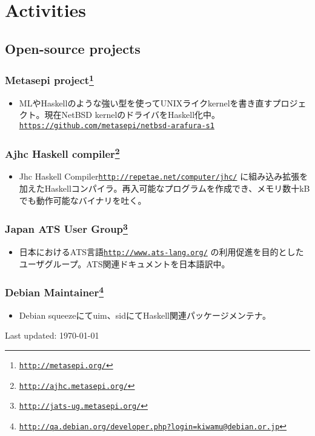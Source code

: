 \documentclass[letterpaper]{article}
\def\footer{
  \begin{center}
    \begin{footnotesize}
      Last updated: \today
    \end{footnotesize}
  \end{center}
}
\begin{document}
\section*{Activities}

\subsection*{Open-source projects}

\subsubsection*{Metasepi project\footnote{\href{http://metasepi.org/}{\tt http://metasepi.org/}}}
\begin{itemize}
\item MLやHaskellのような強い型を使ってUNIXライクkernelを書き直すプロジェクト。現在NetBSD kernelのドライバをHaskell化中。 \href{https://github.com/metasepi/netbsd-arafura-s1}{\tt https://github.com/metasepi/netbsd-arafura-s1}
\end{itemize}

\subsubsection*{Ajhc Haskell compiler\footnote{\href{http://ajhc.metasepi.org/}{\tt http://ajhc.metasepi.org/}}}
\begin{itemize}
\item Jhc Haskell Compiler\href{http://repetae.net/computer/jhc/}{\tt http://repetae.net/computer/jhc/} に組み込み拡張を加えたHaskellコンパイラ。再入可能なプログラムを作成でき、メモリ数十kBでも動作可能なバイナリを吐く。
\end{itemize}

\subsubsection*{Japan ATS User Group\footnote{\href{http://jats-ug.metasepi.org/}{\tt http://jats-ug.metasepi.org/}}}
\begin{itemize}
\item 日本におけるATS言語\href{http://www.ats-lang.org/}{\tt http://www.ats-lang.org/} の利用促進を目的としたユーザグループ。ATS関連ドキュメントを日本語訳中。
\end{itemize}

\subsubsection*{Debian Maintainer\footnote{\href{http://qa.debian.org/developer.php?login=kiwamu@debian.or.jp}{\tt http://qa.debian.org/developer.php?login=kiwamu@debian.or.jp}}}
\begin{itemize}
\item Debian squeezeにてuim、sidにてHaskell関連パッケージメンテナ。
\end{itemize}

\bigskip
\footer
\end{document}
